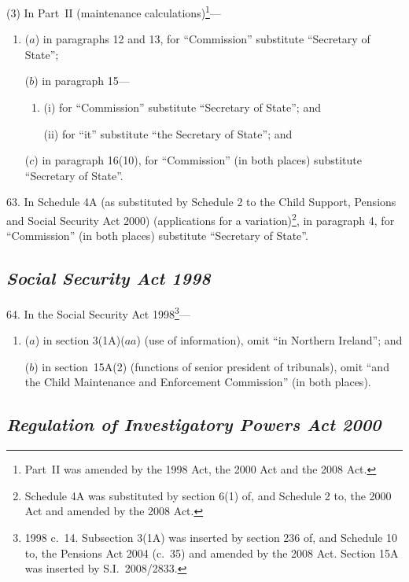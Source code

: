 \documentclass[12pt,a4paper]{article}
\begin{document}
(3) In Part~II (maintenance calculations)\footnote{Part~II was amended by the 1998 Act, the 2000 Act and the 2008 Act.}—
\begin{enumerate}\item[]
($a$) in paragraphs 12 and 13, for “Commission” substitute “Secretary of State”;

($b$) in paragraph 15—
\begin{enumerate}\item[]
(i)  for “Commission” substitute “Secretary of State”; and

(ii) for “it” substitute “the Secretary of State”; and
\end{enumerate}

($c$) in paragraph 16(10), for “Commission” (in both places) substitute “Secretary of State”.
\end{enumerate}

\medskip

63.  In Schedule 4A (as substituted by Schedule 2 to the Child Support, Pensions and Social Security Act 2000) (applications for a variation)\footnote{Schedule 4A was substituted by section 6(1) of, and Schedule 2 to, the 2000 Act and amended by the 2008 Act.}, in paragraph 4, for “Commission” (in both places) substitute “Secretary of State”.

\subsection*{\itshape Social Security Act 1998}

64.  In the Social Security Act 1998\footnote{1998 c.~14. Subsection 3(1A) was inserted by section 236 of, and Schedule 10 to, the Pensions Act 2004 (c.~35) and amended by the 2008 Act. Section 15A was inserted by S.I.~2008/2833.}—
\begin{enumerate}\item[]
($a$) in section 3(1A)($aa$)  (use of information), omit “in Northern Ireland”; and

($b$) in section~15A(2) (functions of senior president of tribunals), omit “and the Child Maintenance and Enforcement Commission” (in both places).
\end{enumerate}

\subsection*{\itshape Regulation of Investigatory Powers Act 2000}
\end{document}
